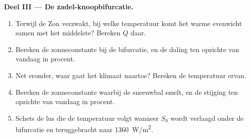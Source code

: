 \begin{problem}
\medskip\noindent\textbf{Deel III --- De zadel-knoopbifurcatie.}
\begin{enumerate}[resume]
\item Terwijl de Zon verzwakt, bij welke temperatuur komt het warme evenwicht
  samen met het middelste? Bereken $Q$ daar.
\item Bereken de zonneconstante bij de bifurcatie, en de daling ten opzichte van
  vandaag in procent.
\item Net eronder, waar gaat het klimaat naartoe? Bereken de temperatuur ervan.
\item Bereken de zonneconstante waarbij de sneeuwbal smelt, en de stijging
  ten opzichte van vandaag in procent.
\item Schets de lus die de temperatuur volgt wanneer $S_0$ wordt verlaagd
  onder de bifurcatie en teruggebracht naar \qty{1360}{W/m^2}.
\end{enumerate}


\end{problem}
